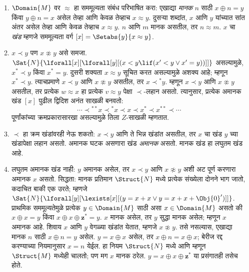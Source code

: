\begin{enumerate}
  $x = y^*$ असेल, तर $x$ आणि $y$ यांपैकी एक मानक
  असल्यास दोन्ही मानक असतात (आणि एक अमानक असल्यास
  दोन्ही अमानक असतात).
\item $\Domain{M}$ वर $\approx$ हा सममूल्यता संबंध
  परिभाषित करा: एखाद्या \emph{मानक} $n$ साठी
  $x \oplus n = y$ किंवा $y \oplus n =x$
  असेल तेव्हा आणि केवळ तेव्हाच $x \approx y$.
  दुसऱ्या शब्दांत, $x$ आणि $y$ यांच्यात सांत अंतर
  असेल तेव्हा आणि केवळ तेव्हाच $x \approx y$.
  $n$ आणि $m$ मानक असतील, तर $n \approx m$.
  $x$ चा \emph{खंड} म्हणजे सममूल्यता वर्ग
  $[x] = \Setabs{y}{x \approx y}$.
\item $x \prec y$ पण $x \not\approx y$ असे समजा.
  $\Sat{N}{\lforall[x][\lforall[y][(x < y \lif (x' < y \lor x' =
      y))]]}$ असल्यामुळे, $x^* \prec y$ किंवा
  $x^* = y$. दुसरी शक्यता $x \approx y$ सूचित
  करत असल्यामुळे अशक्य आहे; म्हणून
  $x^* \prec y$. त्याचप्रमाणे $x \prec y$ आणि
  $x \not\approx y$ असतील, तर $x \prec {^*y}$.
  म्हणून $x \prec y$ आणि $x \not\approx y$ असतील,
  तर प्रत्येक $w \approx x$ हा प्रत्येक $v \approx y$
  पेक्षा $\prec$-लहान असतो. त्यानुसार, प्रत्येक
  अमानक खंड $[x]$ पुढील द्विदिश अनंत साखळी बनवतो:
  \[
  \cdots \prec  {^{**}x} \prec {^*}x \prec x \prec x^* \prec x^{**}
  \prec \cdots
  \]
  पूर्णांकांच्या क्रमप्रकारासारखा असल्यामुळे तिला
  $Z$-साखळी म्हणतात.


\item $\prec$ हा क्रम खंडांवरही नेऊ शकतो: $x \prec y$
  आणि ते भिन्न खंडांत असतील, तर $x$ चा खंड
  $y$ च्या खंडापेक्षा लहान असतो. अमानक घटक असणारा
  खंड \emph{अमानक} असतो. मानक खंड हा लघुतम खंड आहे.

\item लघुतम अमानक खंड नाही: $y$ अमानक असेल,
  तर $x \prec y$ आणि $x \not\approx y$ अशी अट
  पूर्ण करणारा अमानक $x$ असतो. सिद्धता: मानक
  प्रतिमान $\Struct{N}$ मध्ये प्रत्येक संख्येला दोनने
  भाग जातो, कदाचित बाकी एक उरते; म्हणजे
  $\Sat{N}{\lforall[y][\lexists[x][(y = x + x \lor y = x + x +
        \Obj{0}')]]}$. प्राथमिक सममूल्यतेमुळे
  प्रत्येक $y \in \Domain{M}$ साठी असा
  $x \in \Domain{M}$ असतो की $x \oplus x = y$
  किंवा $x \oplus x \oplus \mathbf{z}^*= y$.
  $x$ मानक असेल, तर $y$ सुद्धा मानक असेल;
  म्हणून $x$ अमानक आहे. शिवाय $x$ आणि $y$
  वेगळ्या खंडांत येतात, म्हणजे $x \not\approx y$.
  तसे नसल्यास, एखाद्या मानक $n$ साठी
  $x \oplus n = y$ असेल. $y = x \oplus x$
  असेल, तर $x \oplus n = x \oplus x$; बेरीज
  रद्द करण्याच्या नियमानुसार $x = n$ येईल.
  हा नियम $\Struct{N}$ मध्ये आणि म्हणून
  $\Struct{M}$ मध्येही चालतो; पण मग $x$
  मानक ठरेल. $y = x \oplus x \oplus \mathbf{z}^*$
  या प्रसंगातही तसेच होते.


\end{enumerate}
